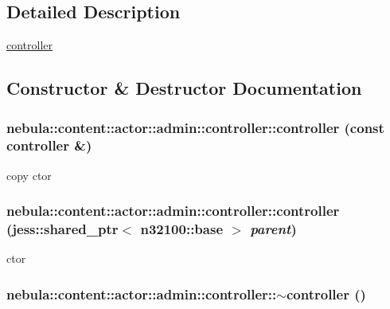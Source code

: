 \subsection{Detailed Description}
\hyperlink{classnebula_1_1content_1_1actor_1_1admin_1_1controller}{controller} 

\subsection{Constructor \& Destructor Documentation}
\hypertarget{classnebula_1_1content_1_1actor_1_1admin_1_1controller_a5609547224ef63eb22044e6e57301b7d}{
\subsubsection[{controller}]{\setlength{\rightskip}{0pt plus 5cm}nebula::content::actor::admin::controller::controller (const {\bf controller} \&)}}
\label{classnebula_1_1content_1_1actor_1_1admin_1_1controller_a5609547224ef63eb22044e6e57301b7d}


copy ctor \hypertarget{classnebula_1_1content_1_1actor_1_1admin_1_1controller_a6d419bce4654e2f59db0b561f08ddb59}{
\subsubsection[{controller}]{\setlength{\rightskip}{0pt plus 5cm}nebula::content::actor::admin::controller::controller (jess::shared\_\-ptr$<$ {\bf n32100::base} $>$ {\em parent})}}
\label{classnebula_1_1content_1_1actor_1_1admin_1_1controller_a6d419bce4654e2f59db0b561f08ddb59}


ctor \hypertarget{classnebula_1_1content_1_1actor_1_1admin_1_1controller_a3f63b0d700a01c43e3ff171321a3d630}{
\subsubsection[{$\sim$controller}]{\setlength{\rightskip}{0pt plus 5cm}nebula::content::actor::admin::controller::$\sim$controller ()}}
\label{classnebula_1_1content_1_1actor_1_1admin_1_1controller_a3f63b0d700a01c43e3ff171321a3d630}


